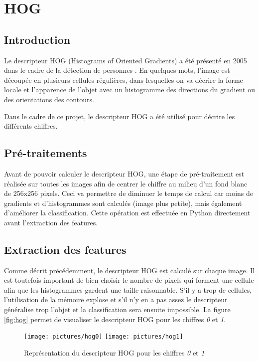 
\chapter{HOG}

\section{Introduction}

Le descripteur HOG (Histograms of Oriented Gradients) a été présenté en 2005 dans le cadre de la détection de personnes \cite{NavneetHOG}. En quelques mots, l'image est découpée en plusieurs cellules régulières, dans lesquelles on va décrire la forme locale et l'apparence de l'objet avec un histogramme des directions du gradient ou des orientations des contours.

Dans le cadre de ce projet, le descripteur HOG a été utilisé pour décrire les différents chiffres.

\section{Pré-traitements}
Avant de pouvoir calculer le descripteur HOG, une étape de pré-traitement est réalisée sur toutes les images afin de centrer le chiffre au milieu d'un fond blanc de 256x256 pixels. Ceci va permettre de diminuer le temps de calcul car moins de gradients et d'histogrammes sont calculés (image plus petite), mais également d'améliorer la classification. Cette opération est effectuée en Python directement avant l'extraction des features.

\section{Extraction des features}

Comme décrit précédemment, le descripteur HOG est calculé sur chaque image. Il est toutefois important de bien choisir le nombre de pixels qui forment une cellule afin que les histogrammes gardent une taille raisonnable. S'il y a trop de cellules, l'utilisation de la mémoire explose et s'il n'y en a pas assez le descripteur généralise trop l'objet et la classification sera ensuite impossible. La figure \vref{fig:hog} permet de visualiser le descripteur HOG pour les chiffres \emph{0} et \emph{1}.

\begin{figure}[!h]
\texttt{[image: pictures/hog0]}
\texttt{[image: pictures/hog1]}
\caption{Représentation du descripteur HOG pour les chiffres \emph{0} et \emph{1}}
\label{fig:hog}
\end{figure}

